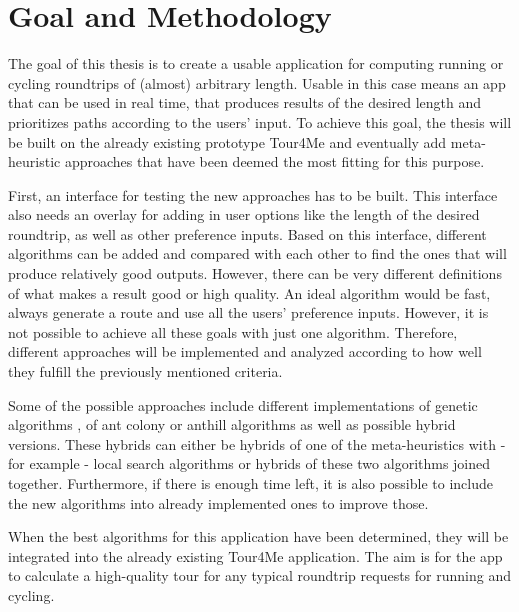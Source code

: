


\section{Goal and Methodology}
\label{sec:goal}


The goal of this thesis is to create a usable application for computing running or cycling roundtrips of (almost) arbitrary length. 
Usable in this case means an app that can be used in real time, that produces results of the desired length and prioritizes paths according to the users' input. 
To achieve this goal, the thesis will be built on the already existing prototype Tour4Me and eventually add meta-heuristic approaches that have been deemed the most fitting for this purpose. 

First, an interface for testing the new approaches has to be built. This interface also needs an overlay for adding in user options like the length of the desired roundtrip, as well as other preference inputs. 
Based on this interface, different algorithms can be added and compared with each other to find the ones that will produce relatively good outputs.
However, there can be very different definitions of what makes a result good or high quality. 
An ideal algorithm would be fast, always generate a route and use all the users' preference inputs.
However, it is not possible to achieve all these goals with just one algorithm. 
Therefore, different approaches will be implemented and analyzed according to how well they fulfill the previously mentioned criteria. 

Some of the possible approaches include different implementations of genetic algorithms \cite{gendreau_handbook_2010}, of ant colony or anthill algorithms \cite{gendreau_handbook_2010, babaoglu_anthill_2002, wang_application_2014} as well as possible hybrid versions.
These hybrids can either be hybrids of one of the meta-heuristics with - for example - local search algorithms \cite{gendreau_handbook_2010, wang_application_2014} or hybrids of these two algorithms joined together.
Furthermore, if there is enough time left, it is also possible to include the new algorithms into already implemented ones to improve those.

When the best algorithms for this application have been determined, they will be integrated into the already existing Tour4Me application. The aim is for the app to calculate a high-quality tour for any typical roundtrip requests for running and cycling.

